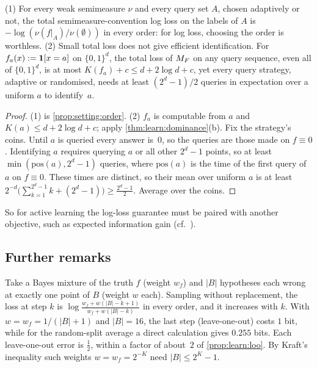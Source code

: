 \begin{proposition}\label{prop:learn:active}
(1) For every weak semimeasure $\nu$ and every query set $A$, chosen adaptively or not, the total semimeasure-convention log loss on the labels of $A$ is $-\log(\nu(f|_A)/\nu(\emptyset))$ in every order: for log loss, choosing the order is worthless.
(2) Small total loss does not give efficient identification. For $f_a(x):=\mathbf{1}[x=a]$ on $\{0,1\}^d$, the total loss of $M_{F}$ on any query sequence, even all of $\{0,1\}^d$, is at most $K(f_a)+c\le d+2\log d+c$, yet every query strategy, adaptive or randomised, needs at least $(2^d-1)/2$ queries in expectation over a uniform $a$ to identify~$a$.
\end{proposition}

\begin{proof}
(1) is \cref{prop:setting:order}. (2) $f_a$ is computable from $a$ and $K(a)\le d+2\log d+c$; apply \cref{thm:learn:dominance}(b). Fix the strategy's coins. Until $a$ is queried every answer is~$0$, so the queries are those made on $f\equiv0$. Identifying $a$ requires querying $a$ or all other $2^d-1$ points, so at least $\min(\mathrm{pos}(a),2^d-1)$ queries, where $\mathrm{pos}(a)$ is the time of the first query of $a$ on $f\equiv0$. These times are distinct, so their mean over uniform $a$ is at least $2^{-d}\big(\sum_{k=1}^{2^d-1}k+(2^d-1)\big)\ge\frac{2^d-1}2$. Average over the coins.
\end{proof}

So for active learning the log-loss guarantee must be paired with another objective, such as expected information gain (cf.\ \citealp{orseau2013universal}).

\subsection{Further remarks}\label{app:learn:remarks}

\begin{example}\label{rem:learn:increasing}
Take a Bayes mixture of the truth $f$ (weight $w_f$) and $|B|$ hypotheses each wrong at exactly one point of $B$ (weight $w$ each). Sampling without replacement, the loss at step $k$ is $\log\frac{w_f+w(|B|-k+1)}{w_f+w(|B|-k)}$ in every order, and it increases with $k$. With $w=w_f=1/(|B|+1)$ and $|B|=16$, the last step (leave-one-out) costs $1$ bit, while for the random-split average a direct calculation gives $0.255$ bits. Each leave-one-out error is $\frac12$, within a factor of about~$2$ of \cref{prop:learn:loo}. By Kraft's inequality such weights $w=w_f=2^{-K}$ need $|B|\le2^K-1$.
\end{example}

